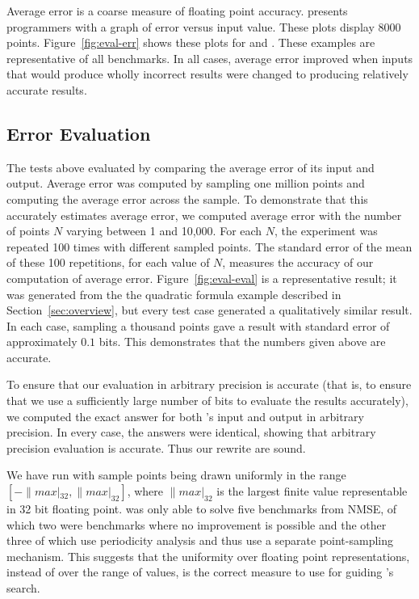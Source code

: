\documentclass[paper.tex]{subfiles}
\begin{document}
Average error is a coarse measure of floating point accuracy.  \casio
presents programmers with a graph of error versus input value.  These
plots display 8000 points.  Figure~\ref{fig:eval-err} shows these
plots for  and .  These examples are
representative of all benchmarks.  In all cases, average error
improved when inputs that would produce wholly incorrect results were
changed to producing relatively accurate results.

\subsection{Error Evaluation}
\label{sec:eval-eval}

The tests above evaluated \casio by comparing the average error of its
input and output.  Average error was computed by sampling one million
points and computing the average error across the sample.  To
demonstrate that this accurately estimates average error, we computed
average error with the number of points $N$ varying between 1 and
10,000.  For each $N$, the experiment was repeated 100 times with
different sampled points.  The standard error of the mean of these 100
repetitions, for each value of $N$, measures the accuracy of our
computation of average error.  Figure~\ref{fig:eval-eval} is a
representative result; it was generated from the the quadratic formula
example described in Section~\ref{sec:overview}, but every test case
generated a qualitatively similar result.  In each case, sampling a
thousand points gave a result with standard error of approximately
$0.1$ bits.  This demonstrates that the numbers given above are
accurate.

To ensure that our evaluation in arbitrary precision is accurate (that
is, to ensure that we use a sufficiently large number of bits to
evaluate the results accurately), we computed the exact answer for
both \casio's input and output in arbitrary precision.  In every case,
the answers were identical, showing that arbitrary precision
evaluation is accurate. Thus our rewrite are sound.

We have run \casio with sample points being drawn uniformly in the
range $[-\|max|_{32}, \|max|_{32}]$, where $\|max|_{32}$ is the
largest finite value representable in 32 bit floating point.  \casio
was only able to solve five benchmarks from NMSE, of which two were
benchmarks where no improvement is possible and the other three of
which use periodicity analysis and thus use a separate point-sampling
mechanism.  This suggests that the uniformity over floating point
representations, instead of over the range of values, is the correct
measure to use for guiding \casio's search.
\end{document}
